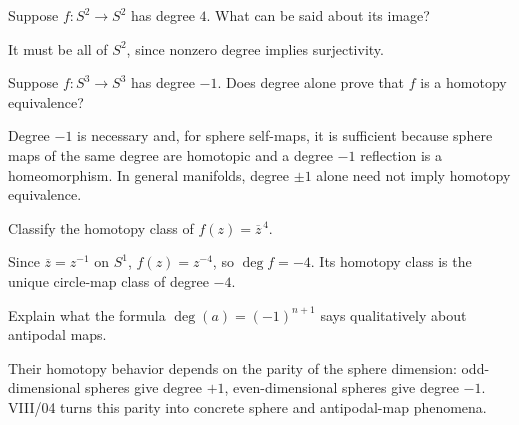 \begin{problem}[Surjectivity]\label{prob:viii03-09}
Suppose \(f:S^2\to S^2\) has degree \(4\).  What can be said about its image?
\end{problem}
\begin{solution}
It must be all of \(S^2\), since nonzero degree implies surjectivity.
\end{solution}

\begin{problem}\label{prob:viii03-10}
Suppose \(f:S^3\to S^3\) has degree \(-1\).  Does degree alone prove that \(f\)
is a homotopy equivalence?
\end{problem}
\begin{solution}
Degree \(-1\) is necessary and, for sphere self-maps, it is sufficient because
sphere maps of the same degree are homotopic and a degree \(-1\) reflection is
a homeomorphism.  In general manifolds, degree \(\pm1\) alone need not imply
homotopy equivalence.
\end{solution}

\begin{problem}\label{prob:viii03-11}
Classify the homotopy class of \(f(z)=\overline z^{\,4}\).
\end{problem}
\begin{solution}
Since \(\overline z=z^{-1}\) on \(S^1\),
\(f(z)=z^{-4}\), so \(\deg f=-4\).  Its homotopy class is the unique circle-map
class of degree \(-4\).
\end{solution}

\begin{problem}\label{prob:viii03-12}
Explain what the formula \(\deg(a)=(-1)^{n+1}\) says qualitatively about
antipodal maps.
\end{problem}
\begin{solution}
Their homotopy behavior depends on the parity of the sphere dimension:
odd-dimensional spheres give degree \(+1\), even-dimensional spheres give
degree \(-1\).  VIII/04 turns this parity into concrete sphere and antipodal-map
phenomena.
\end{solution}
